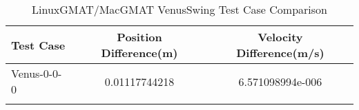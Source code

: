 \begin{table}[htbp!]
\centering
\caption{ LinuxGMAT/MacGMAT VenusSwing Test Case Comparison}
      \begin{tabular}{lcc}
      \hline\hline
          Test Case & Position Difference(m) & Velocity Difference(m/s) \\
         \hline
         Venus-0-0-0 & 0.01117744218 & 6.571098994e-006 \\
      \hline\hline
      \label{Table: VenusSwing LinuxGMAT-MacGMAT Table} 
\end{tabular}
\end{table}
